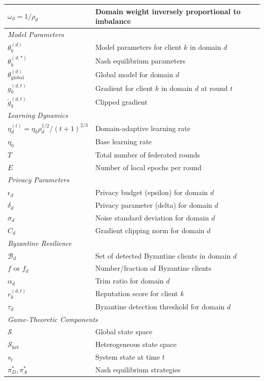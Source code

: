 \documentclass[12pt,a4paper]{article}
\theoremstyle{definition}
\begin{document}
\begin{longtable}{@{}ll@{}}
$\omega_d = 1/\rho_d$ & Domain weight inversely proportional to imbalance \\
\midrule
\multicolumn{2}{l}{\textit{Model Parameters}} \\
$\theta_k^{(d)}$ & Model parameters for client $k$ in domain $d$ \\
$\theta_k^{(d,*)}$ & Nash equilibrium parameters \\
$\theta_{\text{global}}^{(d)}$ & Global model for domain $d$ \\
$g_k^{(d,t)}$ & Gradient for client $k$ in domain $d$ at round $t$ \\
$\tilde{g}_k^{(d,t)}$ & Clipped gradient \\
\midrule
\multicolumn{2}{l}{\textit{Learning Dynamics}} \\
$\eta_d^{(t)} = \eta_0 \rho_d^{1/2} / (t+1)^{2/3}$ & Domain-adaptive learning rate \\
$\eta_0$ & Base learning rate \\
$T$ & Total number of federated rounds \\
$E$ & Number of local epochs per round \\
\midrule
\multicolumn{2}{l}{\textit{Privacy Parameters}} \\
$\epsilon_d$ & Privacy budget (epsilon) for domain $d$ \\
$\delta_d$ & Privacy parameter (delta) for domain $d$ \\
$\sigma_d$ & Noise standard deviation for domain $d$ \\
$C_d$ & Gradient clipping norm for domain $d$ \\
\midrule
\multicolumn{2}{l}{\textit{Byzantine Resilience}} \\
$\mathcal{B}_d$ & Set of detected Byzantine clients in domain $d$ \\
$f$ or $f_d$ & Number/fraction of Byzantine clients \\
$\alpha_d$ & Trim ratio for domain $d$ \\
$r_k^{(d,t)}$ & Reputation score for client $k$ \\
$\tau_d$ & Byzantine detection threshold for domain $d$ \\
\midrule
\multicolumn{2}{l}{\textit{Game-Theoretic Components}} \\
$\mathcal{S}$ & Global state space \\
$\mathcal{S}_{\text{het}}$ & Heterogeneous state space \\
$s_t$ & System state at time $t$ \\
$\pi_D^*, \pi_A^*$ & Nash equilibrium strategies \\

\end{longtable}
\end{document}
